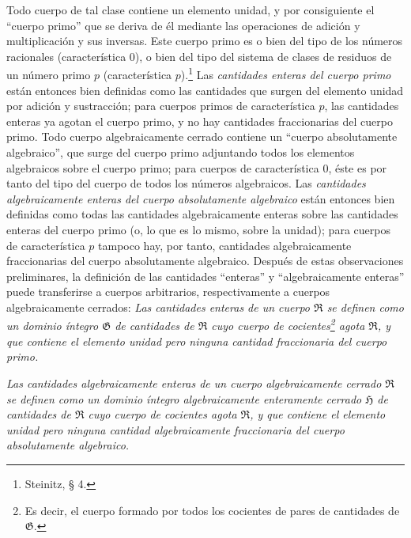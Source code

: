 Todo cuerpo de tal clase contiene un elemento unidad, y por consiguiente el ``cuerpo primo'' que se deriva de él mediante las operaciones de adición y multiplicación y sus inversas. Este cuerpo primo es o bien del tipo de los números racionales (característica $0$), o bien del tipo del sistema de clases de residuos de un número primo $p$ (característica $p$).\footnote{Steinitz, § 4.} Las \emph{cantidades enteras del cuerpo primo} están entonces bien definidas como las cantidades que surgen del elemento unidad por adición y sustracción; para cuerpos primos de característica $p$, las cantidades enteras ya agotan el cuerpo primo, y no hay cantidades fraccionarias del cuerpo primo. Todo cuerpo algebraicamente cerrado contiene un ``cuerpo absolutamente algebraico'', que surge del cuerpo primo adjuntando todos los elementos algebraicos sobre el cuerpo primo; para cuerpos de característica $0$, éste es por tanto del tipo del cuerpo de todos los números algebraicos. Las \emph{cantidades algebraicamente enteras del cuerpo absolutamente algebraico} están entonces bien definidas como todas las cantidades algebraicamente enteras sobre las cantidades enteras del cuerpo primo (o, lo que es lo mismo, sobre la unidad); para cuerpos de característica $p$ tampoco hay, por tanto, cantidades algebraicamente fraccionarias del cuerpo absolutamente algebraico. Después de estas observaciones preliminares, la definición de las cantidades ``enteras'' y ``algebraicamente enteras'' puede transferirse a cuerpos arbitrarios, respectivamente a cuerpos algebraicamente cerrados: \emph{Las cantidades enteras de un cuerpo $\mathfrak R$ se definen como un dominio íntegro $\mathfrak G$ de cantidades de $\mathfrak R$ cuyo cuerpo de cocientes\footnote{Es decir, el cuerpo formado por todos los cocientes de pares de cantidades de $\mathfrak G$.} agota $\mathfrak R$, y que contiene el elemento unidad pero ninguna cantidad fraccionaria del cuerpo primo.}

\emph{Las cantidades algebraicamente enteras de un cuerpo algebraicamente cerrado $\mathfrak R$ se definen como un dominio íntegro algebraicamente enteramente cerrado $\mathfrak H$ de cantidades de $\mathfrak R$ cuyo cuerpo de cocientes agota $\mathfrak R$, y que contiene el elemento unidad pero ninguna cantidad algebraicamente fraccionaria del cuerpo absolutamente algebraico.}

